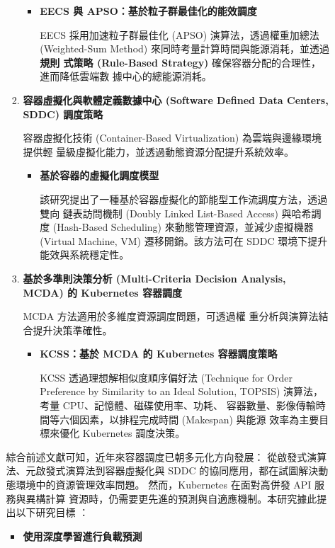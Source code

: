 \documentclass[12pt,a4paper]{article}
\begin{document}
\begin{enumerate}[label={(\zhdig*)}, leftmargin=2\parindent, listparindent=\parindent]
\begin{enumerate}[label={(\arabic*)}, leftmargin=\parindent, listparindent=\parindent]
\begin{enumerate}[label={(\zhdig*)}, leftmargin=\parindent, listparindent=\parindent]
\begin{itemize}[leftmargin=\parindent, listparindent=\parindent]
    \item \textbf{
        \cite{15} EECS 與 APSO：基於粒子群最佳化的能效調度
    }

    EECS 採用加速粒子群最佳化 (APSO) 演算法，透過權重加總法
    (Weighted-Sum Method) 來同時考量計算時間與能源消耗，並透過\textbf{規則
    式策略 (Rule-Based Strategy) }確保容器分配的合理性，進而降低雲端數
    據中心的總能源消耗。

\end{itemize}
\item \textbf{
    容器虛擬化與軟體定義數據中心 (Software Defined Data Centers, SDDC) 調度策略
}

容器虛擬化技術 (Container-Based Virtualization) 為雲端與邊緣環境提供輕
量級虛擬化能力，並透過動態資源分配提升系統效率。
\begin{itemize}[leftmargin=\parindent, listparindent=\parindent]
    \item \textbf{\cite{16} 基於容器的虛擬化調度模型}

    該研究提出了一種基於容器虛擬化的節能型工作流調度方法，透過雙向
    鏈表訪問機制 (Doubly Linked List-Based Access) 與哈希調度 (Hash-Based
    Scheduling) 來動態管理資源，並減少虛擬機器(Virtual Machine, VM)
    遷移開銷。該方法可在 SDDC 環境下提升能效與系統穩定性。

\end{itemize}
\item \textbf{基於多準則決策分析 (Multi-Criteria Decision Analysis, MCDA)
    的 Kubernetes 容器調度}

MCDA 方法適用於多維度資源調度問題，可透過權
重分析與演算法結合提升決策準確性。
\begin{itemize}[leftmargin=\parindent, listparindent=\parindent]
    \item \textbf{\cite{17} KCSS：基於 MCDA 的 Kubernetes 容器調度策略}

    KCSS 透過理想解相似度順序偏好法
    (Technique for Order Preference by Similarity to an Ideal Solution,
    TOPSIS) 演算法，考量 CPU、記憶體、磁碟使用率、功耗、
    容器數量、影像傳輸時間等六個因素，以排程完成時間 (Makespan) 與能源
    效率為主要目標來優化 Kubernetes 調度決策。

\end{itemize}

\end{enumerate}

綜合前述文獻可知，近年來容器調度已朝多元化方向發展：
從啟發式演算法、元啟發式演算法到容器虛擬化與 SDDC
的協同應用，都在試圖解決動態環境中的資源管理效率問題。
然而，Kubernetes 在面對高併發 API 服務與異構計算
資源時，仍需要更先進的預測與自適應機制。本研究據此提
出以下研究目標 ：
\begin{itemize}[leftmargin=\parindent, listparindent=\parindent]
    \item\textbf{使用深度學習進行負載預測}


\end{itemize}
\end{enumerate}
\end{enumerate}
\end{document}
